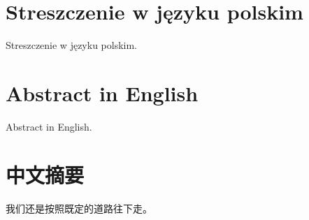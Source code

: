 \chapter*{Streszczenie w języku polskim}
  Streszczenie w języku polskim.
\chapter*{Abstract in English}
  Abstract in English.
\chapter*{中文摘要}
我们还是按照既定的道路往下走。
